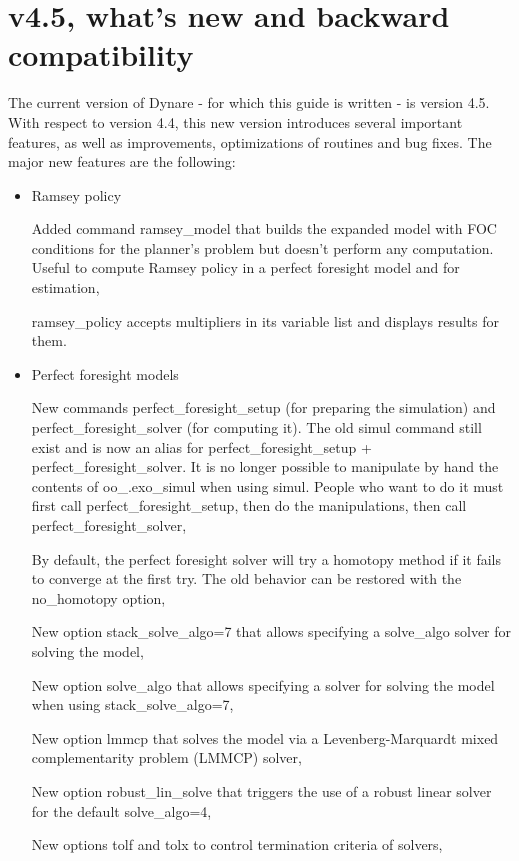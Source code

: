 \documentclass[10pt,math=newtx,citestyle=gb7714-2015,bibstyle=gb7714-2015]{elegantbook}
\begin{document}
	\section{v4.5, what's new and backward compatibility}
	The current version of Dynare - for which this guide is written - is version 4.5. With respect to version 4.4, this new version introduces several important features, as well as improvements, optimizations of routines and bug fixes. The major new features are the following:
	\begin{itemize}
		\item Ramsey policy
		
		
		Added command ramsey\_model that builds the expanded model with FOC conditions for the planner's problem but doesn't perform any computation. Useful to compute Ramsey policy in a perfect foresight model and for estimation,
		
		
		ramsey\_policy accepts multipliers in its variable list and displays results for them.
		
		\item Perfect foresight models
		
		
		New commands perfect\_foresight\_setup (for preparing the simulation) and perfect\_foresight\_solver (for computing it). The old simul command still exist and is now an alias for perfect\_foresight\_setup + perfect\_foresight\_solver. It is no longer possible to manipulate by hand the contents of
		oo\_.exo\_simul when using simul. People who want to do it must first call perfect\_foresight\_setup, then do the manipulations, then call perfect\_foresight\_solver,
		
		
		By default, the perfect foresight solver will try a homotopy method if it fails to converge at the first try. The old behavior can be restored with the no\_homotopy option,
		
		
		New option stack\_solve\_algo=7 that allows specifying a solve\_algo solver for solving the model,
		
		
		New option solve\_algo that allows specifying a solver for solving the model when using stack\_solve\_algo=7,
		
		
		New option lmmcp that solves the model via a Levenberg-Marquardt mixed complementarity problem (LMMCP) solver,
		
		
		New option robust\_lin\_solve that triggers the use of a robust linear solver for the default solve\_algo=4,
		
		
		New options tolf and tolx to control termination criteria of solvers,
		

\end{itemize}
\end{document}
